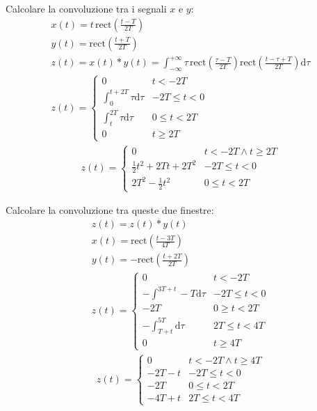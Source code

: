 \documentclass{article}
\newcommand{\rect}{\mbox{rect}}
\newcommand{\df}{\mathrm{d}}
\begin{document}
Calcolare la convoluzione tra i segnali $x$ e $y$:
\begin{gather*}
    x(t)=\displaystyle t\,\rect\left(\frac{t-T}{2T}\right)\\
    y(t)=\displaystyle\rect\left(\frac{t+T}{2T}\right)\\
    z(t)=x(t)*y(t)=\displaystyle\int_{-\infty}^{+\infty}\tau\,\rect\left(\frac{\tau-T}{2T}\right)\rect\left(\frac{t-\tau+T}{2T}\right)\df\tau\\
    z(t)=\begin{cases}
        0&t<-2T\\
        \displaystyle\int_{0}^{t+2T}\tau \df\tau&-2T\leq t<0\\
        \displaystyle\int_{t}^{2T}\tau \df\tau&0\leq t<2T\\
        0&t\geq2T
    \end{cases}
\end{gather*}
\begin{gather}
    z(t)=\begin{cases}
        0&t<-2T\land t\geq2T\\
        \displaystyle\frac{1}{2}t^2+2Tt+2T^2&-2T\leq t<0\\
        \displaystyle2T^2-\frac{1}{2}t^2&0\leq t<2T
    \end{cases}
\end{gather}


Calcolare la convoluzione tra queste due finestre:
\begin{gather*}
    z(t)=z(t)*y(t)\\
    x(t)=\displaystyle\rect\left(\frac{t-3T}{4T}\right)\\
    y(t)=-\displaystyle\rect\left(\frac{t+2T}{2T}\right)\\
    z(t)=\begin{cases}
        0&t<-2T\\
        -\displaystyle\int^{3T+t}-{T}\df\tau&-2T\leq t<0\\
        -2T&0\geq t<2T\\
        -\displaystyle\int_{T+t}^{5T}\df\tau&2T\leq t<4T\\
        0&t\geq 4T
    \end{cases}
\end{gather*}
\begin{gather}
    z(t)=\begin{cases}
        0&t<-2T \land t\geq 4T\\
        -2T-t&-2T\leq t<0\\
        -2T&0\leq t<2T\\
        -4T+t&2T\leq t<4T
    \end{cases}
\end{gather}
\end{document}
